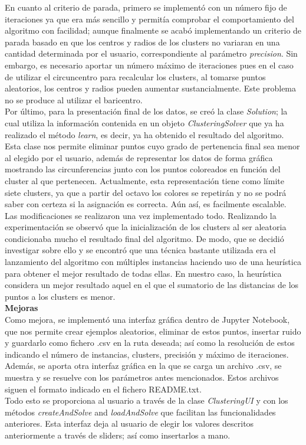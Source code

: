 \documentclass[conference,a4paper]{IEEEtran}
\begin{document}
En cuanto al criterio de parada, primero se implementó con un número fijo de iteraciones ya que era más sencillo y permitía comprobar el comportamiento del algoritmo con facilidad; aunque finalmente se acabó implementando un criterio de parada basado en que los centros y radios de los clusters no variaran en una cantidad determinada por el usuario, correspondiente al parámetro \textit{precision}. Sin embargo, es necesario aportar un número máximo de iteraciones pues en el caso de utilizar el circuncentro para recalcular los clusters, al tomarse puntos aleatorios, los centros y radios pueden aumentar sustancialmente. Este problema no se produce al utilizar el baricentro.\\

Por último, para la presentación final de los datos, se creó la clase  \textit{Solution}; la cual utiliza la información contenida en un objeto \textit{ClusteringSolver} que ya ha realizado el método  \textit{learn}, es decir, ya ha obtenido el resultado del algoritmo. Esta clase nos permite eliminar puntos cuyo grado de pertenencia final sea menor al elegido por el usuario, además de representar los datos de forma gráfica mostrando las circunferencias junto con los puntos coloreados en función del cluster al que pertenecen. Actualmente, esta representación tiene como límite siete clusters, ya que a partir del octavo los colores se repetirán y no se podrá saber con certeza si la asignación es correcta. Aún así, es facilmente escalable.\\

Las modificaciones se realizaron una vez implementado todo. Realizando la experimentación se observó que la inicialización de los clusters al ser aleatoria condicionaba mucho el resultado final del algoritmo. De modo, que se decidió investigar sobre ello y se encontró que una técnica bastante utilizada era el lanzamiento del algoritmo con múltiples instancias haciendo uso de una heurística para obtener el mejor resultado de todas ellas. En nuestro caso, la heurística  considera un mejor resultado aquel en el que el sumatorio de las distancias de los puntos a los clusters es menor.\\

\textbf{Mejoras}\\

Como mejora, se implementó una interfaz gráfica dentro de Jupyter Notebook, que nos permite crear ejemplos aleatorios, eliminar de estos puntos, insertar ruido y guardarlo como fichero .csv en la ruta deseada; así como la resolución de estos indicando el número de instancias, clusters, precisión y máximo de iteraciones. Además, se aporta otra interfaz gráfica en la que se carga un archivo .csv, se muestra y se resuelve con los parámetros antes mencionados. Estos archivos siguen el formato indicado en el fichero README.txt.\\
Todo esto se proporciona al usuario a través de la clase \textit{ClusteringUI} y con los métodos \textit{createAndSolve} and \textit{loadAndSolve} que facilitan las funcionalidades anteriores. Esta interfaz deja al usuario de elegir los valores descritos anteriormente a través de sliders; así como insertarlos a mano.\\
\end{document}
